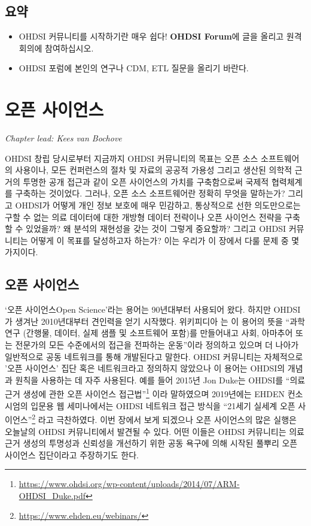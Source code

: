 \documentclass[11pt]{book}
\let\rmarkdownfootnote\footnote%
\def\footnote{\protect\rmarkdownfootnote}
\theoremstyle{definition}
\theoremstyle{definition}
\theoremstyle{definition}
\theoremstyle{remark}
\let\BeginKnitrBlock\begin \let\EndKnitrBlock\end
\begin{document}
\section{요약}\label{-1}

\BeginKnitrBlock{rmdsummary}
\begin{itemize}
\item
  OHDSI 커뮤니티를 시작하기란 매우 쉽다! \textbf{OHDSI Forum}에 글을
  올리고 원격 회의에 참여하십시오.
\item
  OHDSI 포럼에 본인의 연구나 CDM, ETL 질문을 올리기 바란다.
\end{itemize}
\EndKnitrBlock{rmdsummary}

\chapter{오픈 사이언스}\label{OpenScience}


\emph{Chapter lead: Kees van Bochove}

OHDSI 창립 당시로부터 지금까지 OHDSI 커뮤니티의 목표는 오픈 소스
소프트웨어의 사용이나, 모든 컨퍼런스의 절차 및 자료의 공공적 가용성
그리고 생산된 의학적 근거의 투명한 공개 접근과 같이 오픈 사이언스의
가치를 구축함으로써 국제적 협력체계를 구축하는 것이었다. 그러나, 오픈
소스 소프트웨어란 정확히 무엇을 말하는가? 그리고 OHDSI가 어떻게 개인
정보 보호에 매우 민감하고, 통상적으로 선한 의도만으로는 구할 수 없는
의료 데이터에 대한 개방형 데이터 전략이나 오픈 사이언스 전략을 구축할 수
있었을까? 왜 분석의 재현성을 갖는 것이 그렇게 중요할까? 그리고 OHDSI
커뮤니티는 어떻게 이 목표를 달성하고자 하는가? 이는 우리가 이 장에서
다룰 문제 중 몇 가지이다.

\section{오픈 사이언스}\label{-}

`오픈 사이언스Open Science'라는 용어는 90년대부터 사용되어 왔다. 하지만
OHDSI가 생겨난 2010년대부터 견인력을 얻기 시작했다. 위키피디아
\citep{wiki:Open_science} 는 이 용어의 뜻을 ``과학 연구 (간행물, 데이터,
실제 샘플 및 소프트웨어 포함)를 만들어내고 사회, 아마추어 또는 전문가의
모든 수준에서의 접근을 전파하는 운동''이라 정의하고 있으며 더 나아가
일반적으로 공동 네트워크를 통해 개발된다고 말한다. OHDSI 커뮤니티는
자체적으로 '오픈 사이언스' 집단 혹은 네트워크라고 정의하지 않았으나 이
용어는 OHDSI의 개념과 원칙을 사용하는 데 자주 사용된다. 예를 들어 2015년
Jon Duke는 OHDSI를 ``의료 근거 생성에 관한 오픈 사이언스
접근법''\footnote{\url{https://www.ohdsi.org/wp-content/uploads/2014/07/ARM-OHDSI_Duke.pdf}}
이라 말하였으며 2019년에는 EHDEN 컨소시엄의 입문용 웹 세미나에서는 OHDSI
네트워크 접근 방식을 ``21세기 실세계 오픈 사이언스''\footnote{\url{https://www.ehden.eu/webinars/}}
라고 극찬하였다. 이번 장에서 보게 되겠으나 오픈 사이언스의 많은 실행은
오늘날의 OHDSI 커뮤니티에서 발견될 수 있다. 어떤 이들은 OHDSI 커뮤니티는
의료 근거 생성의 투명성과 신뢰성을 개선하기 위한 공동 욕구에 의해 시작된
풀뿌리 오픈 사이언스 집단이라고 주장하기도 한다.
\end{document}
